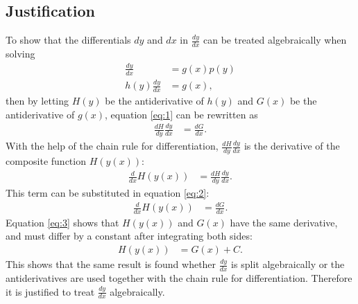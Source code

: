 \subsection{Justification} 
To show that the differentials $dy$ and $dx$ in $\frac{dy}{dx}$ can be treated algebraically when solving 
 \begin{align}
	\frac{dy}{dx} &= g(x)p(y)\nonumber\\
	h(y)\frac{dy}{dx} &= g(x)\label{eq:1},
 \end{align}
then by letting $H(y)$ be the antiderivative of $h(y)$ and $G(x)$ be the antiderivative of $g(x)$, equation \ref{eq:1} can be rewritten as 
 \begin{align}
 	\frac{dH}{dy}\frac{dy}{dx} &= \frac{dG}{dx}\label{eq:2}.
 \end{align}
With the help of the chain rule for differentiation, $\frac{dH}{dy}\frac{dy}{dx}$ is the derivative of the composite function $H(y(x))$:
 \begin{align*}
	\frac{d}{dx} H(y(x)) &= \frac{dH}{dy}\frac{dy}{dx}.
 \end{align*}
This term can be substituted in equation \ref{eq:2}:
 \begin{align}
 	\frac{d}{dx}H(y(x)) &= \frac{dG}{dx}\label{eq:3}.
 \end{align}
Equation \ref{eq:3} shows that $H(y(x))$ and $G(x)$ have the same derivative, and must differ by a constant after integrating both sides:
 \begin{align*}
 	H(y(x)) &= G(x) + C.
 \end{align*}
This shows that the same result is found whether $\frac{dy}{dx}$ is split algebraically or the antiderivatives are used together with the chain rule for differentiation. Therefore it is justified to treat $\frac{dy}{dx}$ algebraically.

